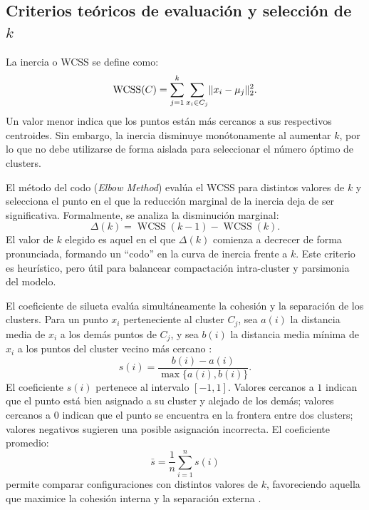 \documentclass[11pt,letterpaper]{article}
\numberwithin{equation}{section}
\DeclarePairedDelimiter{\norm}{\lVert}{\rVert}
\DeclareMathOperator{\WCSS}{WCSS}
\theoremstyle{plain}
\begin{document}
\subsection{Criterios teóricos de evaluación y selección de \texorpdfstring{$k$}{k}}

La inercia o WCSS se define como:
\begin{equation}
\WCSS(C) = \sum_{j=1}^{k} \sum_{x_i \in C_j} \norm{x_i - \mu_j}_2^2.
\end{equation}
Un valor menor indica que los puntos están más cercanos a sus respectivos centroides. Sin embargo, la inercia disminuye monótonamente al aumentar $k$, por lo que no debe utilizarse de forma aislada para seleccionar el número óptimo de clusters.

El método del codo (\textit{Elbow Method}) evalúa el WCSS para distintos valores de $k$ y selecciona el punto en el que la reducción marginal de la inercia deja de ser significativa. Formalmente, se analiza la disminución marginal:
\begin{equation}
\Delta(k) = \WCSS(k-1) - \WCSS(k).
\end{equation}
El valor de $k$ elegido es aquel en el que $\Delta(k)$ comienza a decrecer de forma pronunciada, formando un ``codo'' en la curva de inercia frente a $k$. Este criterio es heurístico, pero útil para balancear compactación intra-cluster y parsimonia del modelo.

El coeficiente de silueta evalúa simultáneamente la cohesión y la separación de los clusters. Para un punto $x_i$ perteneciente al cluster $C_j$, sea $a(i)$ la distancia media de $x_i$ a los demás puntos de $C_j$, y sea $b(i)$ la distancia media mínima de $x_i$ a los puntos del cluster vecino más cercano \citep{rousseeuw1987}:
\begin{equation}
s(i) = \frac{b(i) - a(i)}{\max\{a(i), b(i)\}}.
\end{equation}
El coeficiente $s(i)$ pertenece al intervalo $[-1, 1]$. Valores cercanos a $1$ indican que el punto está bien asignado a su cluster y alejado de los demás; valores cercanos a $0$ indican que el punto se encuentra en la frontera entre dos clusters; valores negativos sugieren una posible asignación incorrecta. El coeficiente promedio:
\begin{equation}
\bar{s} = \frac{1}{n} \sum_{i=1}^{n} s(i)
\end{equation}
permite comparar configuraciones con distintos valores de $k$, favoreciendo aquella que maximice la cohesión interna y la separación externa \citep{rousseeuw1987}.
\end{document}
